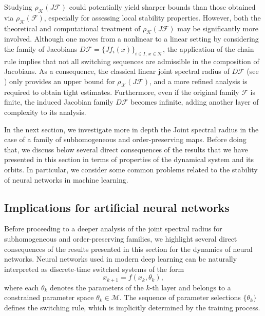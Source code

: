 \documentclass{article}
\newcommand{\family}{\mathcal{F}}
\newcommand{\cradius}{\rho_{\cone}}
\newcommand{\cone}{\mathcal{K}}
\begin{document}
Studying $\cradius(J\family)$ could potentially yield sharper bounds than those obtained via $\cradius(\family)$, especially for assessing local stability properties. However, both the theoretical and computational treatment of $\cradius(J\family)$ may be significantly more involved. Although one moves from a nonlinear to a linear setting by considering the family of Jacobians $D\family = \{Jf_i(x)\}_{i \in I,\, x \in \cone}$, the application of the chain rule implies that not all switching sequences are admissible in the composition of Jacobians. As a consequence, the classical linear joint spectral radius of $D\family$ (see \cite{jungers2009joint}) only provides an upper bound for $\cradius(J\family)$, and a more refined analysis is required to obtain tight estimates. Furthermore, even if the original family $\family$ is finite, the induced Jacobian family $D\family$ becomes infinite, adding another layer of complexity to its analysis.



%
In the next section, we investigate more in depth the Joint spectral radius in the case of a family of subhomogeneous and order-preserving maps. Before doing that, we discuss below several direct consequences of the results that we have presented in this section in terms of properties of the dynamical system and its orbits. In particular, we consider some common problems related to the stability of neural networks in machine learning.



\subsection*{Implications for artificial neural networks}

Before proceeding to a deeper analysis of the joint spectral radius for subhomogeneous and order-preserving families, we highlight several direct consequences of the results presented in this section for the dynamics of neural networks. Neural networks used in modern deep learning can be naturally interpreted as discrete-time switched systems of the form
\begin{equation}
    x_{k+1} = f(x_k, \theta_k),
\end{equation}
where each $\theta_k$ denotes the parameters of the $k$-th layer and belongs to a constrained parameter space $\theta_k \in \mathcal{M}$. The sequence of parameter selections $\{\theta_k\}$ defines the switching rule, which is implicitly determined by the training process.
\end{document}
